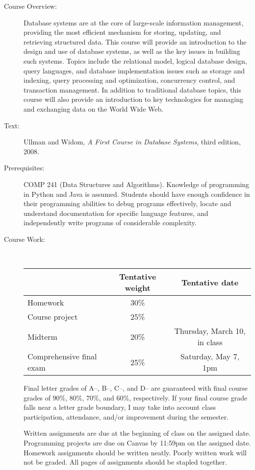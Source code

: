 \documentclass [letterpaper,11pt]{article}
\begin{document}
\begin{description}
\item[Course Overview:] Database systems are at the core of large-scale information management, providing the most efficient mechanism for storing, updating, and retrieving structured data. This course will provide an introduction to the design and use of database systems, as well as the key issues in building such systems. Topics include the relational model, logical database design, query languages, and database implementation issues such as storage and indexing, query processing and optimization, concurrency control, and transaction management. In addition to traditional database topics, this course will also provide an introduction to key technologies for managing and exchanging data on the World Wide Web. 

\item[Text:] Ullman and Widom, \textit{A First Course in Database Systems}, third edition, 2008.

\item[Prerequisites:] COMP 241 (Data Structures and Algorithms).  Knowledge of programming
in Python and Java is assumed.  Students should have enough confidence in their
programming abilities to debug programs effectively, locate and understand documentation for specific language features, and independently write programs of considerable complexity.

\item[Course Work:] \

\begin{tabular}{lcc} 
& Tentative weight & Tentative date \\ \hline
Homework & 30\% & \\
Course project & 25\% & \\
Midterm & 20\% & Thursday, March 10, in class\\
Comprehensive final exam & 25\% & Saturday, May 7, 1pm\\
\end{tabular}

Final letter grades of A--, B--, C--, and D-- are guaranteed with final course grades of 90\%, 80\%,
70\%, and 60\%, respectively.
If your final course grade falls near a letter grade boundary,
I may take into account class participation, attendance, and/or improvement during the semester.

Written assignments are due at the beginning of class on the assigned date. Programming
projects are due on Canvas by 11:59pm on the assigned date.  Homework assignments should be
written neatly. Poorly written work will not be graded. All pages of assignments should be
stapled together.


\end{description}
\end{document}
